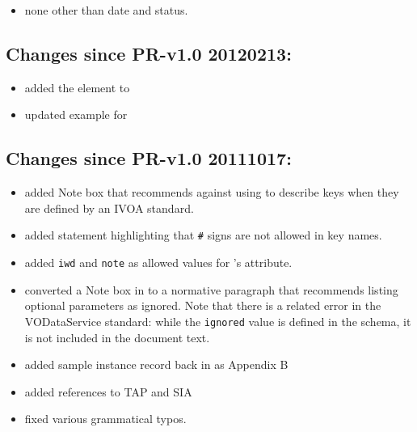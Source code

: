 \documentclass[11pt,a4paper]{ivoa}
\begin{document}
\begin{itemize}
\item  none other than date and status.
\end{itemize}

\subsection{Changes since PR-v1.0 20120213:}

\begin{itemize}
\item  added the  element to

\item  updated example for 

\end{itemize}

\subsection{Changes since PR-v1.0 20111017:}

\begin{itemize}
\item  added Note box that recommends against using
        to
       describe keys when they are defined by an IVOA standard.

\item  added statement highlighting that \verb|#| signs are
       not allowed in key names.

\item  added \texttt{iwd} and \texttt{note} as allowed values
       for 's
        attribute.

\item  converted a Note box in to a normative paragraph
       that recommends listing optional 
       parameters as ignored.  Note that there is a related error in
       the VODataService standard: while
       the \texttt{ignored} value is defined in
       the schema, it is not included in the document text.

\item  added sample 
       instance record back in as Appendix B

\item  added references to TAP and SIA

\item  fixed various grammatical typos.

\end{itemize}
\end{document}
